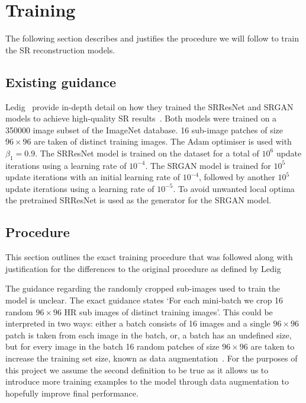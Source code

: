 \section{Training}
The following section describes and justifies the procedure we will follow to train the SR reconstruction models.

\subsection{Existing guidance}
Ledig \etal\ provide in-depth detail on how they trained the SRResNet and SRGAN models to achieve high-quality SR results~\cite{srgan}. Both models were trained on a 350000 image subset of the ImageNet database. 16 sub-image patches of size $96 \times 96$ are taken of distinct training images. The Adam optimiser is used with $\beta_1 = 0.9$. The SRResNet model is trained on the dataset for a total of $10^6$ update iterations using a learning rate of $10^{-4}$. The SRGAN model is trained for $10^5$ update iterations with an initial learning rate of $10^{-4}$, followed by another $10^5$ update iterations using a learning rate of $10^{-5}$. To avoid unwanted local optima the pretrained SRResNet is used as the generator for the SRGAN model.

\subsection{Procedure}\label{subsec:procedure}
This section outlines the exact training procedure that was followed along with justification for the differences to the original procedure as defined by Ledig \etal

The guidance regarding the randomly cropped sub-images used to train the model is unclear. The exact guidance states `For each mini-batch we crop 16 random $96 \times 96$ HR sub images of distinct training images'. This could be interpreted in two ways: either a batch consists of 16 images and a single $96 \times 96$ patch is taken from each image in the batch, or, a batch has an undefined size, but for every image in the batch 16 random patches of size $96 \times 96$ are taken to increase the training set size, known as data augmentation~\cite{dataAugmentation}. For the purposes of this project we assume the second definition to be true as it allows us to introduce more training examples to the model through data augmentation to hopefully improve final performance.

